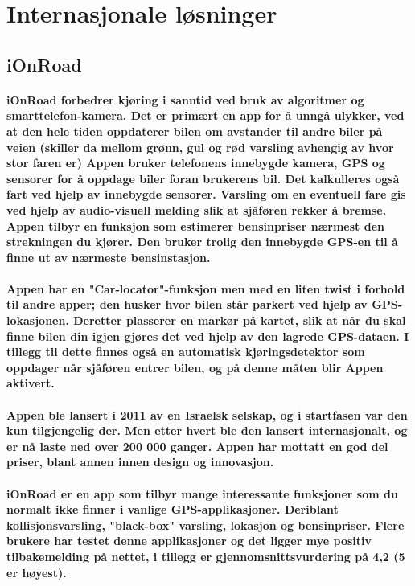 \section{Internasjonale løsninger}

\subsection{iOnRoad}
\paragraph{iOnRoad forbedrer kjøring i sanntid ved bruk av algoritmer og smarttelefon-kamera. Det er primært en app for å unngå ulykker, ved at den hele tiden oppdaterer bilen om avstander til andre biler på veien (skiller da mellom grønn, gul og rød varsling avhengig av hvor stor faren er) Appen bruker telefonens innebygde kamera, GPS  og sensorer for å oppdage biler foran brukerens bil. Det kalkulleres også fart ved hjelp av innebygde sensorer. Varsling om en eventuell fare gis ved hjelp av audio-visuell melding slik at sjåføren rekker å bremse. Appen tilbyr en funksjon som estimerer bensinpriser nærmest den strekningen du kjører. Den bruker trolig den innebygde GPS-en til å finne ut av nærmeste bensinstasjon.}

\paragraph{Appen har en "Car-locator"-funksjon men med en liten twist i forhold til andre apper; den husker hvor bilen står parkert ved hjelp av GPS-lokasjonen. Deretter plasserer en markør på kartet, slik at når du skal finne bilen din igjen gjøres det ved hjelp av den lagrede GPS-dataen. I tillegg til dette finnes også en automatisk kjøringsdetektor som oppdager når sjåføren entrer bilen, og på denne måten blir Appen aktivert.}

\paragraph{Appen ble lansert i 2011 av en Israelsk selskap, og i startfasen var den kun tilgjengelig der. Men etter hvert ble den lansert internasjonalt, og er nå laste ned over 200 000 ganger. Appen har mottatt en god del priser, blant annen innen design og innovasjon.}

\paragraph{iOnRoad er en app som tilbyr mange interessante funksjoner som du normalt ikke finner i vanlige GPS-applikasjoner. Deriblant kollisjonsvarsling, "black-box" varsling, lokasjon og bensinpriser. Flere brukere har testet denne applikasjoner og det ligger mye positiv tilbakemelding på nettet, i tillegg er gjennomsnittsvurdering på 4,2 (5 er høyest).}


